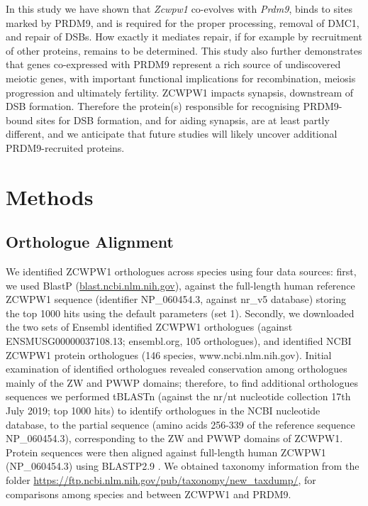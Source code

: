 In this study we have shown that \textit{Zcwpw1} co-evolves with \textit{Prdm9}, binds to sites marked by PRDM9, and is required for the proper processing, removal of DMC1, and repair of DSBs.
How exactly it mediates repair, if for example by recruitment of other proteins, remains to be determined.
This study also further demonstrates that genes co-expressed with PRDM9 represent a rich source of undiscovered meiotic genes, with important functional implications for recombination, meiosis progression and ultimately fertility.
ZCWPW1 impacts synapsis, downstream of DSB formation.
Therefore the protein(s) responsible for recognising PRDM9-bound sites for DSB formation, and for aiding synapsis, are at least partly different, and we anticipate that future studies will likely uncover additional PRDM9-recruited proteins.

\section{Methods}
\subsection{Orthologue Alignment}
\label{sec:orthologues}
We identified ZCWPW1 orthologues across species using four data sources: first, we used BlastP (\url{blast.ncbi.nlm.nih.gov}), against the full-length human reference ZCWPW1 sequence (identifier NP\_060454.3, against nr\_v5 database) storing the top 1000 hits using the default parameters (set 1).
Secondly, we downloaded the two sets of Ensembl identified ZCWPW1 orthologues (against ENSMUSG00000037108.13; ensembl.org, 105 orthologues), and identified NCBI ZCWPW1 protein orthologues (146 species, www.ncbi.nlm.nih.gov).
Initial examination of identified orthologues revealed conservation among orthologues mainly of the ZW and PWWP domains; therefore, to find additional orthologues sequences we performed tBLASTn (against the nr/nt nucleotide collection 17th July 2019; top 1000 hits) to identify orthologues in the NCBI nucleotide database, to the partial sequence (amino acids 256-339 of the reference sequence NP\_060454.3), corresponding to the ZW and PWWP domains of ZCWPW1.
Protein sequences were then aligned against full-length human ZCWPW1 (NP\_060454.3) using BLASTP2.9 \parencite{Altschul1997Gapped,Altschul2005Protein}.
We obtained taxonomy information from the folder \url{https://ftp.ncbi.nlm.nih.gov/pub/taxonomy/new_taxdump/}, for comparisons among species and between ZCWPW1 and PRDM9.

